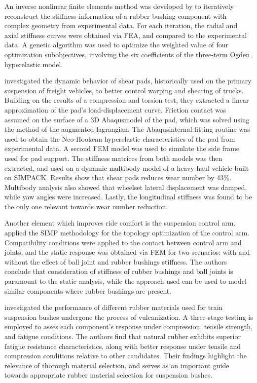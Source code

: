 An inverse nonlinear finite elements method was developed by \textcite{lei2013} to iteratively reconstruct the stiffness information of a rubber bushing component with complex geometry from experimental data. For each iteration, the radial and axial stiffness curves were obtained via FEA, and compared to the experimental data. A genetic algorithm was used to optimize the weighted value of four optimization subobjectives, involving the six coefficients of the three-term Ogden hyperelastic model. 

\textcite{lima2022} investigated the dynamic behavior of shear pads, historically used on the primary suspension of freight vehicles, to better control warping and shearing of trucks. Building on the results of a compression and torsion test, they extracted a linear approximation of the pad's load-displacement curve. Friction contact was assumed on the surface of a 3D Abaqus\textregistered model of the pad, which was solved using the method of the augmented lagrangian. The Abaqus\textregistered internal fitting routine was used to obtain the Neo-Hookean hyperelastic characteristics of the pad from experimental data. A second FEM model was used to simulate the side frame used for pad support. The stiffness matrices from both models was then extracted, and used on a dynamic multibody model of a heavy-haul vehicle built on SIMPACK\textregistered. Results show that shear pads reduces wear number by 43\%. Multibody analysis also showed that wheelset lateral displacement was damped, while yaw angles were increased. Lastly, the longitudinal stiffness was found to be the only one relevant towards wear number reduction.

Another element which improves ride comfort is the suspension control arm. \textcite{tang2014} applied the SIMP methodology for the topology optimization of the control arm. Compatibility conditions were applied to the contact between control arm and joints, and the static response was obtained via FEM for two scenarios: with and without the effect of ball joint and rubber bushings stiffness. The authors conclude that consideration of stiffness of rubber bushings and ball joints is paramount to the static analysis, while the approach used can be used to model similar components where rubber bushings are present.

\textcite{vinith2024} investigated the performance of different rubber materials used for train suspension bushes undergone the process of vulcanization. A three-stage testing is employed to asses each component's response under compression, tensile strength, and fatigue conditions. The authors find that natural rubber exhibits superior fatigue resistance characteristics, along with better response under tensile and compression conditions relative to other candidates. Their findings highlight the relevance of thorough material selection, and serves as an important guide towards appropriate rubber material selection for suspension bushes.